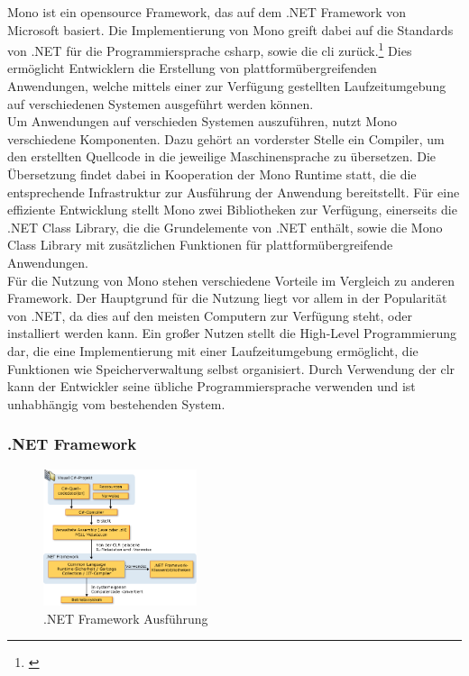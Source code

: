 Mono ist ein opensource Framework, das auf dem .NET Framework von Microsoft basiert. Die Implementierung von Mono greift dabei auf die Standards von .NET für die Programmiersprache \gls{csharp}, sowie die \gls{cli} zurück.\footnote{\citep[vgl.][About Mono]{MonoProject.AboutMono}\label{note6}} Dies ermöglicht Entwicklern die Erstellung von plattformübergreifenden Anwendungen, welche mittels einer zur Verfügung gestellten Laufzeitumgebung auf verschiedenen Systemen ausgeführt werden können.\\
Um Anwendungen auf verschieden Systemen auszuführen, nutzt Mono verschiedene Komponenten. Dazu gehört an vorderster Stelle ein Compiler, um den erstellten Quellcode in die jeweilige Maschinensprache zu übersetzen. Die Übersetzung findet dabei in Kooperation der Mono Runtime statt, die die entsprechende Infrastruktur zur Ausführung der Anwendung bereitstellt. Für eine effiziente Entwicklung stellt Mono zwei Bibliotheken zur Verfügung, einerseits die .NET Class Library, die die Grundelemente von .NET enthält, sowie die Mono Class Library mit zusätzlichen Funktionen für plattformübergreifende Anwendungen.\\
Für die Nutzung von Mono stehen verschiedene Vorteile im Vergleich zu anderen Framework. Der Hauptgrund für die Nutzung liegt vor allem in der Popularität von .NET, da dies auf den meisten Computern zur Verfügung steht, oder installiert werden kann. Ein großer Nutzen stellt die High-Level Programmierung dar, die eine Implementierung mit einer Laufzeitumgebung ermöglicht, die Funktionen wie Speicherverwaltung selbst organisiert. Durch Verwendung der \gls{clr} kann der Entwickler seine übliche Programmiersprache verwenden und ist unhabhängig vom bestehenden System.

\color{process}

\newpage
\subsubsection{.NET Framework}\label{net}

\begin{figure}
	\begin{center}
		\includegraphics[width=0.4\textwidth]{images/technische_grundlagen/net_aufbau.jpeg}
	\end{center}
	\caption{.NET Framework Ausführung}
	\label{fig:net}
\end{figure}

